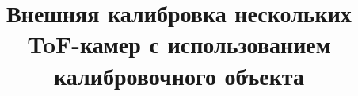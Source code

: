 \grnti{}
\asjc{}
\oecd{}

\title{Внешняя калибровка нескольких ToF-камер с использованием калибровочного объекта}


